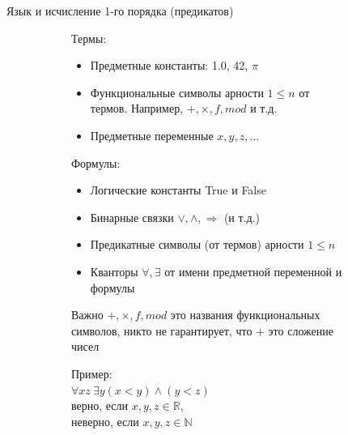  \begin{frame}{Язык и исчисление 1-го порядка (предикатов)}
 	\begin{figure}[t]
 		\begin{subfigure}[t]{0.5\textwidth}
 			Термы:
 			\begin{itemize}
 				\item Предметные константы: 1.0, 42, $\pi$
 				\item Функциональные символы арности  $1\leqslant n$ от термов. Например, $+, \times, f, mod$ и т.д.
 				\item Предметные переменные $x,y,z,\dots$
 			\end{itemize}
 			Формулы:
 			\begin{itemize}
 				\item Логические константы True и False
 				\item Бинарные связки $\vee, \wedge, \Rightarrow$ (и т.д.) %
 				\item Предикатные символы (от термов) арности $1\leqslant n$
 				\item Кванторы $\forall, \exists$ от имени предметной переменной и формулы
 			\end{itemize}
 		\end{subfigure}
 		\hspace{0.05\textwidth}
 		\begin{subfigure}[t]{0.4\textwidth}
 			\begin{block}{Важно}
 				$+, \times, f, mod$ это названия функциональных символов, никто не гарантирует, что  $+$ это сложение чисел
 			\end{block}
 			\vspace{1em}
 			Пример: \\
 			$\forall x z\ \exists y (x < y) \wedge (y < z)$\\
 			верно, если $x,y,z \in \mathbb{R}$, \\
 			неверно, если $x,y,z \in \mathbb{N}$
 		\end{subfigure}
 	\end{figure}
 \end{frame}

